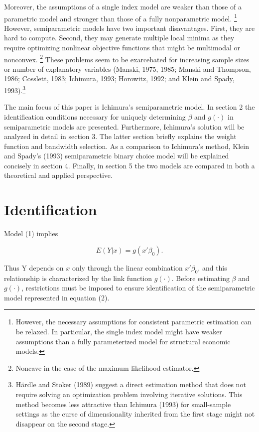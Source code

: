 \documentclass[a4paper]{article}
\begin{document}
Moreover, the assumptions of a single index model are weaker than those of a parametric model and stronger than those of a fully nonparametric model.  \footnote{However, the necessary assumptions for consistent parametric estimation can be relaxed. In particular, the single index model might have weaker assumptions than a fully parameterized model for structural economic models.} However, semiparametric models have two important disavantages. First, they are hard to compute. Second, they may generate multiple local minima as they require optimizing nonlinear objective functions that might be multimodal or nonconvex. \footnote{Noncave in the case of the maximum likelihood estimator.} These problems seem to be exarcebated for increasing sample sizes or number of explanatory variables (Manski, 1975, 1985; Manski and Thompson, 1986; Cosslett, 1983; Ichimura, 1993; Horowitz, 1992; and Klein and Spady, 1993).\footnote{H{\"a}rdle and Stoker (1989) suggest a direct estimation method that does not require solving an optimization problem involving iterative solutions. This method becomes less attractive than Ichimura (1993) for small-sample settings as the curse of dimensionality inherited from the first stage might not disappear on the second stage. }

The main focus of this paper is Ichimura's semiparametric model. In section 2 the identification conditions necessary for uniquely determining $\beta$ and $g(\cdot)$ in semiparametric models are presented.  Furthermore, Ichimura's solution will be analyzed in detail in section 3. The latter section briefly explains the weight function and bandwidth selection. As a comparison to Ichimura's method, Klein and Spady's (1993) semiparametric binary choice model will be explained concisely in section 4. Finally, in section 5 the two models are compared in both a theoretical and applied perspective.

\section{Identification} %
\label{sec:Identification}

Model (1) implies

\begin{equation}
E(Y|x) = g(x'\beta_0).
\end{equation}

Thus Y depends on $x$ only through the linear combination $x'\beta_0$, and this relationship is characterized by the link function $g(\cdot)$. Before estimating  $\beta$ and $ g(\cdot)$, restrictions must be imposed to ensure identification of the semiparametric model represented in equation (2).
\end{document}
